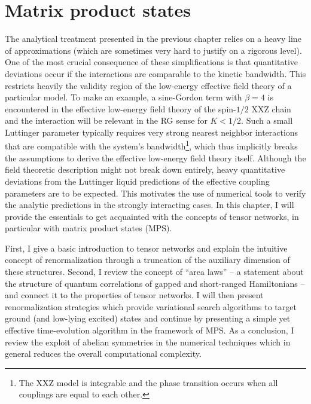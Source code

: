 %
%
\chapter{Matrix product states}
\label{ch:matrix_product_states}
%
%
The analytical treatment presented in the previous chapter relies on a heavy line of approximations (which are sometimes very hard to justify on a rigorous level).
One of the most crucial consequence of these simplifications is that quantitative deviations occur if the interactions are comparable to the kinetic bandwidth.
This restricts heavily the validity region of the low-energy effective field theory of a particular model.
To make an example, a sine-Gordon term with $\beta=4$ is encountered in the effective low-energy field theory of the spin-$1/2$ XXZ chain and the interaction will be relevant in the RG sense for $K<1/2$.
Such a small Luttinger parameter typically requires very strong nearest neighbor interactions that are compatible with the system's bandwidth\footnote{The XXZ model is integrable and the phase transition occurs when all couplings are equal to each other.}, which thus implicitly breaks the assumptions to derive the effective low-energy field theory itself.
Although the field theoretic description might not break down entirely, heavy quantitative deviations from the Luttinger liquid predictions of the effective coupling parameters are to be expected.
This motivates the use of numerical tools to verify the analytic predictions in the strongly interacting cases.
In this chapter, I will provide the essentials to get acquainted with the concepts of tensor networks, in particular with matrix product states (MPS).

First, I give a basic introduction to tensor networks and explain the intuitive concept of renormalization through a truncation of the auxiliary dimension of these structures.
Second, I review the concept of ``area laws'' -- a statement about the structure of quantum correlations of gapped and short-ranged Hamiltonians -- and connect it to the properties of tensor networks.
I will then present renormalization strategies which provide variational search algorithms to target ground (and low-lying excited) states and continue by presenting a simple yet effective time-evolution algorithm in the framework of MPS.
As a conclusion, I review the exploit of abelian symmetries in the numerical techniques which in general reduces the overall computational complexity.
%
%
